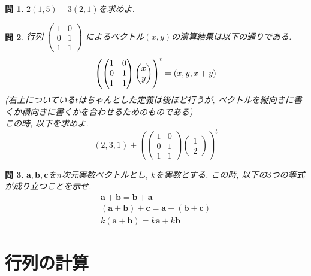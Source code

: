 \documentclass[a4paper,12pt]{jreport}
\newtheorem{problem}{問}[chapter]
\theoremstyle{definition}
\begin{document}
   \begin{problem}
      $2(1,5)-3(2,1)$を求めよ.
   \end{problem}
   \begin{problem}
      行列
      $
      \begin{pmatrix}
         1 & 0\\
         0 & 1\\
         1 & 1
      \end{pmatrix}
      $
      によるベクトル$(x,y)$の演算結果は以下の通りである.
      $$
      \left(
      \begin{pmatrix}
         1 & 0\\
         0 & 1\\
         1 & 1
      \end{pmatrix}
      \begin{pmatrix}
         x\\
         y
      \end{pmatrix}
      \right)^t
      =
      (x,y,x+y)\\
      $$
      (右上についている$t$はちゃんとした定義は後ほど行うが, ベクトルを縦向きに書くか横向きに書くかを合わせるためのものである)\\
      この時, 以下を求めよ.
      $$
      (2,3,1)+
      \left(
      \begin{pmatrix}
         1 & 0\\
         0 & 1\\
         1 & 1
      \end{pmatrix}
      \begin{pmatrix}
         1\\
         2
      \end{pmatrix}
      \right)^t
      $$
   \end{problem}
   \begin{problem}
      $\bm{a},\bm{b},\bm{c}$を$n$次元実数ベクトルとし, $k$を実数とする.
      この時, 以下の$3$つの等式が成り立つことを示せ.
      \begin{eqnarray*}
         \bm{a}+\bm{b}=\bm{b}+\bm{a}\\
         (\bm{a}+\bm{b})+\bm{c}=\bm{a}+(\bm{b}+\bm{c})\\
         k(\bm{a}+\bm{b})=k\bm{a}+k\bm{b}
      \end{eqnarray*}
   \end{problem}

   \chapter{行列の計算}
\end{document}
